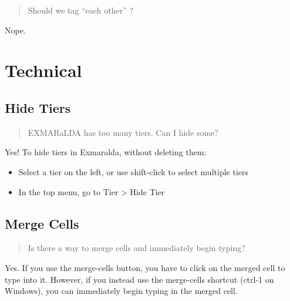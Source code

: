 \documentclass[
]{book}
\providecommand{\tightlist}{%
  \setlength{\itemsep}{0pt}\setlength{\parskip}{0pt}}
\begin{document}
\begin{quote}
Should we tag ``each other'' ?
\end{quote}

Nope.

\hypertarget{technical}{%
\section{Technical}\label{technical}}

\hypertarget{hide-tiers}{%
\subsection{Hide Tiers}\label{hide-tiers}}

\begin{quote}
EXMARaLDA has too many tiers. Can I hide some?
\end{quote}

Yes! To hide tiers in Exmaralda, without deleting them:

\begin{itemize}
\tightlist
\item
  Select a tier on the left, or use shift-click to select multiple tiers
\item
  In the top menu, go to Tier \textgreater{} Hide Tier
\end{itemize}

\hypertarget{merge-cells}{%
\subsection{Merge Cells}\label{merge-cells}}

\begin{quote}
Is there a way to merge cells and immediately begin typing?
\end{quote}

Yes.
If you use the merge-cells button, you have to click on the merged cell to type into it.
However, if you instead use the merge-cells shortcut (ctrl-1 on Windows), you can immediately begin typing in the merged cell.
\end{document}
